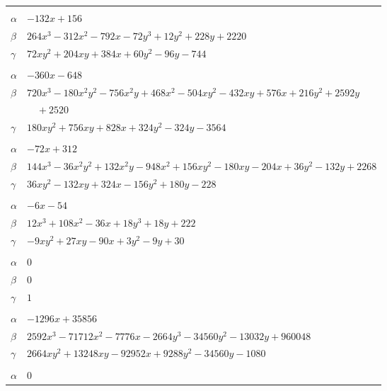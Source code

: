 \documentclass[11pt]{article}
\begin{document}
\begin{longtable}{@{}ll@{}}
\addlinespace[3pt]
\multicolumn{2}{@{}l}{$\{i,j\}=\{111,135\}$, $k_{ij}=2^{4}\cdot 3\cdot 7\cdot 19$}\\
$\alpha$ & $-132x+156$\\
$\beta$ & $264x^{3}-312x^{2}-792x-72y^{3}+12y^{2}+228y+2220$\\
$\gamma$ & $72xy^{2}+204xy+384x+60y^{2}-96y-744$\\
\addlinespace[3pt]
\multicolumn{2}{@{}l}{$\{i,j\}=\{111,154\}$, $k_{ij}=2^{4}\cdot 3^{3}\cdot 13$}\\
$\alpha$ & $-360x-648$\\
$\beta$ & $720x^{3}-180x^{2}y^{2}-756x^{2}y+468x^{2}-504xy^{2}-432xy+576x+216y^{2}+2592y$\\
 & $\quad +2520$\\
$\gamma$ & $180xy^{2}+756xy+828x+324y^{2}-324y-3564$\\
\addlinespace[3pt]
\multicolumn{2}{@{}l}{$\{i,j\}=\{111,172\}$, $k_{ij}=2^{4}\cdot 3^{2}\cdot 7^{2}$}\\
$\alpha$ & $-72x+312$\\
$\beta$ & $144x^{3}-36x^{2}y^{2}+132x^{2}y-948x^{2}+156xy^{2}-180xy-204x+36y^{2}-132y+2268$\\
$\gamma$ & $36xy^{2}-132xy+324x-156y^{2}+180y-228$\\
\addlinespace[3pt]
\multicolumn{2}{@{}l}{$\{i,j\}=\{111,175\}$, $k_{ij}=2^{3}\cdot 3^{2}\cdot 7$}\\
$\alpha$ & $-6x-54$\\
$\beta$ & $12x^{3}+108x^{2}-36x+18y^{3}+18y+222$\\
$\gamma$ & $-9xy^{2}+27xy-90x+3y^{2}-9y+30$\\
\addlinespace[3pt]
\multicolumn{2}{@{}l}{$\{i,j\}=\{111,176\}$, $k_{ij}=2$}\\
$\alpha$ & $0$\\
$\beta$ & $0$\\
$\gamma$ & $1$\\
\addlinespace[3pt]
\multicolumn{2}{@{}l}{$\{i,j\}=\{111,177\}$, $k_{ij}=2^{6}\cdot 3^{3}\cdot 7\cdot 13\cdot 19$}\\
$\alpha$ & $-1296x+35856$\\
$\beta$ & $2592x^{3}-71712x^{2}-7776x-2664y^{3}-34560y^{2}-13032y+960048$\\
$\gamma$ & $2664xy^{2}+13248xy-92952x+9288y^{2}-34560y-1080$\\
\addlinespace[3pt]
\multicolumn{2}{@{}l}{$\{i,j\}=\{111,216\}$, $k_{ij}=2^{3}\cdot 3\cdot 7$}\\
$\alpha$ & $0$\\

\end{longtable}
\end{document}

